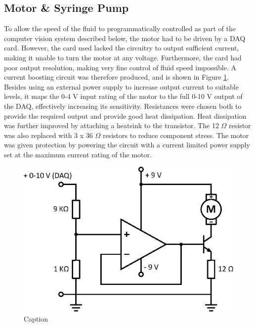 \documentclass{physics_article_B}
\begin{document}
    \subsection{Motor \& Syringe Pump\label{sect:method:motor}}

        To allow the speed of the fluid to programmatically controlled as part of the computer vision system described below, the motor had to be driven by a DAQ card. However, the card used lacked the circuitry to output sufficient current, making it unable to turn the motor at any voltage. Furthermore, the card had poor output resolution, making very fine control of fluid speed impossible. A current boosting circuit was therefore produced, and is shown in Figure \ref{fig:MotorCircuit}. Besides using an external power supply to increase output current to suitable levels, it maps the 0-4 V input rating of the motor to the full 0-10 V output of the DAQ, effectively increasing its sensitivity. Resistances were chosen both to provide the required output and provide good heat dissipation. Heat dissipation was further improved by attaching a heatsink to the transistor. The 12 $\Omega$ resistor was also replaced with 3 x 36 $\Omega$ resistors to reduce component stress. The motor was given protection by powering the circuit with a current limited power supply set at the maximum current rating of the motor. 
        
            \begin{figure}[H]
                \centering
                \hspace*{-1.8cm}\includegraphics[scale=0.8]{Figures/MotorCircuit.eps}
                \caption{Caption}
                \label{fig:MotorCircuit}
            \end{figure}
        
\end{document}
